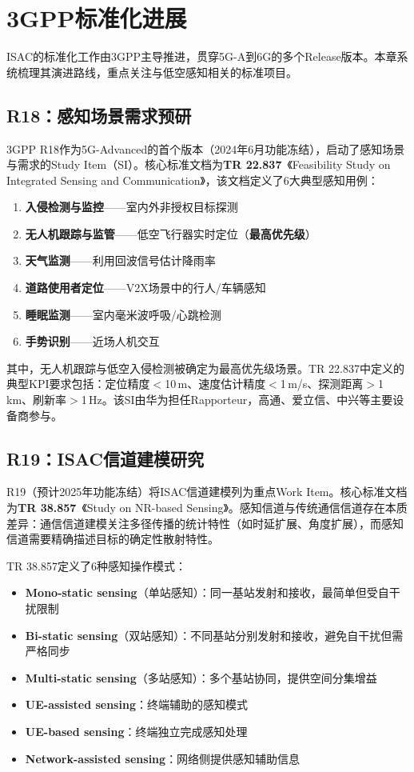 \section{3GPP标准化进展}

ISAC的标准化工作由3GPP主导推进，贯穿5G-A到6G的多个Release版本。本章系统梳理其演进路线，重点关注与低空感知相关的标准项目。

\subsection{R18：感知场景需求预研}

3GPP R18作为5G-Advanced的首个版本（2024年6月功能冻结），启动了感知场景与需求的Study Item（SI）。核心标准文档为\textbf{TR 22.837}~\cite{tr22837}《Feasibility Study on Integrated Sensing and Communication》，该文档定义了6大典型感知用例：

\begin{enumerate}[label=(\arabic*)]
  \item \textbf{入侵检测与监控}——室内外非授权目标探测
  \item \textbf{无人机跟踪与监管}——低空飞行器实时定位（\textbf{最高优先级}）
  \item \textbf{天气监测}——利用回波信号估计降雨率
  \item \textbf{道路使用者定位}——V2X场景中的行人/车辆感知
  \item \textbf{睡眠监测}——室内毫米波呼吸/心跳检测
  \item \textbf{手势识别}——近场人机交互
\end{enumerate}

其中，无人机跟踪与低空入侵检测被确定为最高优先级场景。TR 22.837中定义的典型KPI要求包括：定位精度$<$10\,m、速度估计精度$<$1\,m/s、探测距离$>$1\,km、刷新率$>$1\,Hz。该SI由华为担任Rapporteur，高通、爱立信、中兴等主要设备商参与。

\subsection{R19：ISAC信道建模研究}

R19（预计2025年功能冻结）将ISAC信道建模列为重点Work Item。核心标准文档为\textbf{TR 38.857}~\cite{tr38857}《Study on NR-based Sensing》。感知信道与传统通信信道存在本质差异：通信信道建模关注多径传播的统计特性（如时延扩展、角度扩展），而感知信道需要精确描述目标的确定性散射特性。

TR 38.857定义了6种感知操作模式：
\begin{itemize}
  \item \textbf{Mono-static sensing}（单站感知）：同一基站发射和接收，最简单但受自干扰限制
  \item \textbf{Bi-static sensing}（双站感知）：不同基站分别发射和接收，避免自干扰但需严格同步
  \item \textbf{Multi-static sensing}（多站感知）：多个基站协同，提供空间分集增益
  \item \textbf{UE-assisted sensing}：终端辅助的感知模式
  \item \textbf{UE-based sensing}：终端独立完成感知处理
  \item \textbf{Network-assisted sensing}：网络侧提供感知辅助信息
\end{itemize}

